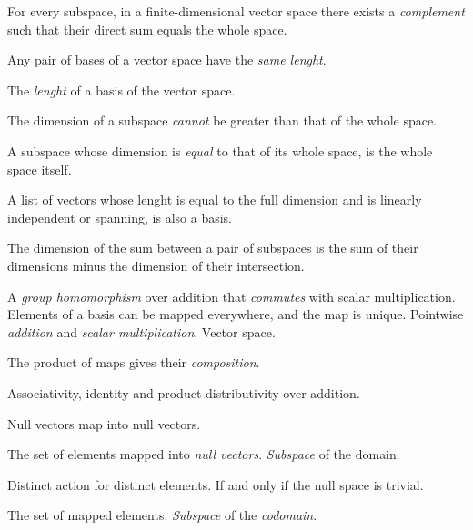 \begin{multicols}{3}
  For every subspace, in a finite-dimensional vector space there exists a \textit{complement} such that their direct sum equals the whole space.
  
  Any pair of bases of a vector space have the \textit{same lenght}.
  
  The \textit{lenght} of a basis of the vector space.
  
  The dimension of a subspace \textit{cannot} be greater than that of the whole space.
  
  A subspace whose dimension is \textit{equal} to that of its whole space, is the whole space itself.
  
  A list of vectors whose lenght is equal to the full dimension and is linearly independent or spanning, is also a basis.
  
  The dimension of the sum between a pair of subspaces is the sum of their dimensions minus the dimension of their intersection.

  A \textit{group homomorphism} over addition that \textit{commutes} with scalar multiplication.
  Elements of a basis can be mapped everywhere, and the map is unique.
  Pointwise \textit{addition} and \textit{scalar multiplication}.
  Vector space.

  The product of maps gives their \textit{composition}.

  Associativity, identity and product distributivity over addition.

  Null vectors map into null vectors.

  The set of elements mapped into \textit{null vectors}.
  \textit{Subspace} of the domain.

  Distinct action for distinct elements.
  If and only if the null space is trivial.

  The set of mapped elements.
  \textit{Subspace} of the \textit{codomain}.


\end{multicols}
